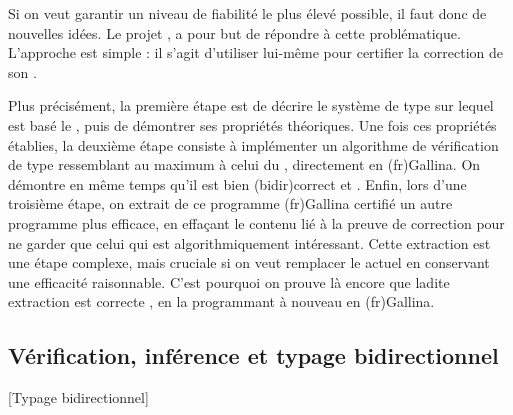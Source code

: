 Si on veut garantir un niveau de fiabilité le plus élevé possible, il faut donc de nouvelles idées.
Le projet , a pour but de répondre à cette problématique.
L’approche est simple : il s’agit d’utiliser  lui-même pour certifier la correction de son .

Plus précisément, la première étape est de décrire le système de type sur lequel est basé le , puis de démontrer ses propriétés théoriques.
Une fois ces propriétés établies, la deuxième étape
consiste à implémenter un algorithme de vérification de type ressemblant au maximum à celui du , directement en \kl(fr){Gallina}.
On démontre en même temps qu’il est bien \reintro(bidir){correct}%
et %
.
Enfin, lors d’une troisième étape, on extrait de ce programme \kl(fr){Gallina} certifié
un autre programme plus efficace, en effaçant le contenu lié à la preuve de correction
pour ne garder que celui qui est algorithmiquement intéressant.
Cette extraction est une étape complexe,
mais cruciale si on veut remplacer le  actuel en conservant une
efficacité raisonnable.
C’est pourquoi on prouve là encore que ladite extraction est correcte%
,
en la programmant à nouveau en \kl(fr){Gallina}.

\subsection{Vérification, inférence et typage bidirectionnel}[Typage bidirectionnel]


